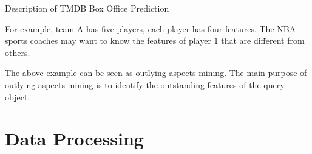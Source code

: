 \documentclass[
 size=12pt,
 paper=smartboard,  %
 mode=present, 		%
 display=slides, 	%
 style=tuliplab,  	%
 pauseslide,
 fleqn,leqno]{powerdot}
\begin{document}
\begin{slide}{Description of TMDB Box Office Prediction}
\begin{note}
For example, team A has five players,
each player has four features.
The NBA sports coaches may want to know the features of
player $1$ that are different from others.

The above example can be seen as outlying aspects mining.
The main purpose of outlying aspects mining is to identify
the outstanding features of the query object.
\end{note}

\end{slide}


\section{Data Processing}
\end{document}
